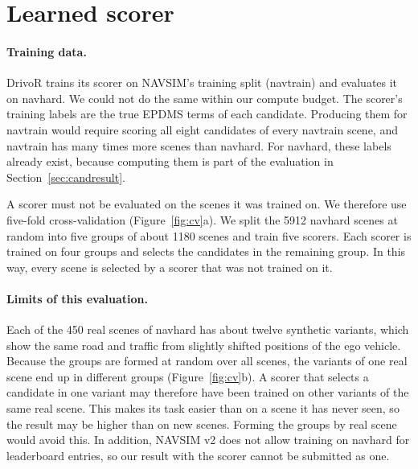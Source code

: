 \documentclass[11pt, a4paper, oneside]{book}
\begin{document}
\section{Learned scorer}
\label{sec:scorerresult}

\paragraph{Training data.} DrivoR trains its scorer on NAVSIM's training split (navtrain) and
evaluates it on navhard. We could not do the same within our compute budget. The scorer's
training labels are the true EPDMS terms of each candidate. Producing them for navtrain would
require scoring all eight candidates of every navtrain scene, and navtrain has many times more
scenes than navhard. For navhard, these labels already exist, because computing them is part of
the evaluation in Section~\ref{sec:candresult}.

A scorer must not be evaluated on the scenes it was trained on. We therefore use five-fold
cross-validation (Figure~\ref{fig:cv}a). We split the \num{5912} navhard scenes at random into
five groups of about \num{1180} scenes and train five scorers. Each scorer is trained on four
groups and selects the candidates in the remaining group. In this way, every scene is selected
by a scorer that was not trained on it.



\paragraph{Limits of this evaluation.} Each of the 450 real scenes of navhard has about twelve
synthetic variants, which show the same road and traffic from slightly shifted positions of the
ego vehicle. Because the groups are formed at random over all scenes, the variants of one real
scene end up in different groups (Figure~\ref{fig:cv}b). A scorer that selects a candidate in
one variant may therefore have been trained on other variants of the same real scene. This makes
its task easier than on a scene it has never seen, so the result may be higher than on new
scenes. Forming the groups by real scene would avoid this. In addition, NAVSIM v2 does not allow
training on navhard for leaderboard entries, so our result with the scorer cannot be submitted
as one.
\end{document}
